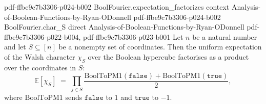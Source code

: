 \begin{lemma}
{    pdf-ffbe9c7b3306-p024-b002}
\proofstep
  {BoolFourier.expectation_factorizes}
  {context}
  {Analysis-of-Boolean-Functions-by-Ryan-ODonnell}
  {pdf-ffbe9c7b3306-p024-b002}
\proofstep
  {BoolFourier.char_S}
  {direct}
  {Analysis-of-Boolean-Functions-by-Ryan-ODonnell}
  {pdf-ffbe9c7b3306-p022-b004,
    pdf-ffbe9c7b3306-p023-b001}
Let $n$ be a natural number and let $S \subseteq [n]$ be a nonempty set of coordinates.
Then the uniform expectation of the Walsh character $\chi_S$ over the Boolean hypercube
factorises as a product over the coordinates in $S$:
\[
  \mathbb{E}[\chi_S]
  \;=\; \prod_{j \in S}
\frac{\mathrm{BoolToPM1}(\mathtt{false}) + \mathrm{BoolToPM1}(\mathtt{true})}{2},
\]
where $\mathrm{BoolToPM1}$ sends $\mathtt{false}$ to $1$ and $\mathtt{true}$ to $-1$.
\end{lemma}

